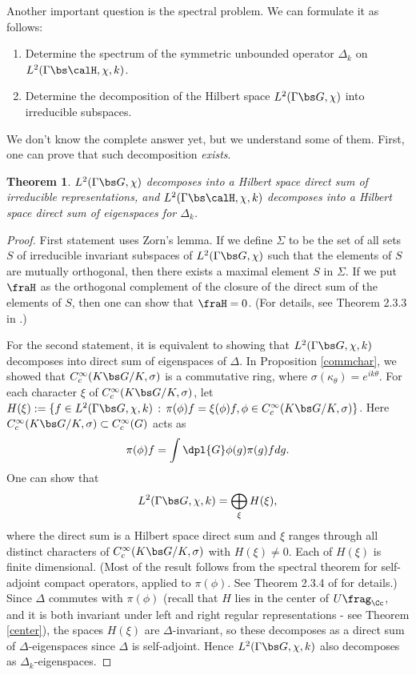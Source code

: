 \documentclass{article}
\newtheorem{theorem}{Theorem}[section]
\begin{document}
Another important question is the spectral problem. We can formulate it as follows: 
\begin{enumerate}
\item Determine the spectrum of the symmetric unbounded operator $\Delta_k$ on $L^{2}(\Gamma \bs \calH, \chi, k)$. 
\item Determine the decomposition of the Hilbert space $L^{2}(\Gamma \bs G, \chi)$ into irreducible subspaces. 
\end{enumerate}
We don't know the complete answer yet, but we  understand some of them. First, one can prove that such decomposition \emph{exists}. 
\begin{theorem}
\label{l2decomp}
$L^{2}(\Gamma \bs G, \chi)$ decomposes into a Hilbert space direct sum of  irreducible representations, and $L^{2}(\Gamma\bs\calH, \chi, k)$ decomposes into a Hilbert space direct sum of eigenspaces for $\Delta_k$. 
\end{theorem}
\begin{proof}
First statement uses Zorn's lemma. If we define $\Sigma$ to be the set of all sets $S$ of irreducible invariant subspaces of $L^{2}(\Gamma \bs G, \chi)$ such that the elements of $S$ are mutually orthogonal, then there exists a maximal element $S$ in $\Sigma$. 
If we put $\fraH$ as the orthogonal complement of the closure of the direct sum of the elements of $S$, then one can show that $\fraH = 0$. (For details, see Theorem 2.3.3 in \cite{bu}.)

For the second statement, it is equivalent to showing that $L^{2}(\Gamma \bs G, \chi, k)$ decomposes into direct sum of eigenspaces of $\Delta$. 
In Proposition \ref{commchar}, we showed that $C_{c}^{\infty}(K\bs G /K, \sigma)$ is a commutative ring, where $\sigma(\kappa_{\theta}) = e^{ik\theta}$. 
For each character $\xi$ of $C_{c}^{\infty}(K\bs G/K, \sigma)$, let $H(\xi) := \{f\in L^{2}(\Gamma \bs G, \chi, k)\,:\, \pi(\phi)f = \xi(\phi)f, \phi\in C_{c}^{\infty}(K\bs G/K, \sigma)\}$. 
Here $C_{c}^{\infty}(K\bs G/K, \sigma)\subset C_{c}^{\infty}(G)$ acts as
$$
\pi(\phi)f = \int\dpl{G} \phi(g)\pi(g)f dg. 
$$
One can show that 
$$
L^{2}(\Gamma \bs G, \chi, k) = \bigoplus_{\xi} H(\xi), 
$$
where the direct sum is a Hilbert space direct sum and $\xi$ ranges through all distinct characters of $C_{c}^{\infty}(K\bs G/K, \sigma)$ with $H(\xi)\neq 0$. 
Each of $H(\xi)$ is finite dimensional. (Most of the result follows from the spectral theorem for self-adjoint compact operators, applied to $\pi(\phi)$. See Theorem 2.3.4 of \cite{bu} for details.) 
Since $\Delta$ commutes with $\pi(\phi)$ (recall that $H$ lies in the center of $U\frag_{\Cc}$, and it is both invariant under left and right regular representations - see Theorem \ref{center}), the spaces $H(\xi)$ are $\Delta$-invariant, so these decomposes as a direct sum of $\Delta$-eigenspaces since $\Delta$ is self-adjoint. Hence $L^{2}(\Gamma \bs G, \chi, k)$ also decomposes as $\Delta_k$-eigenspaces. 
\end{proof}
\end{document}
